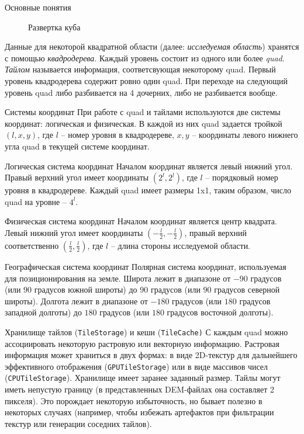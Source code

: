 \documentclass[12pt]{article}
\newcommand{\englishterm}[1]{\textenglish{\texttt{#1}}}
\begin{document}
\begin{section}{Основные понятия}
\begin{figure}[h]
\begin{minipage}{0.45\textwidth}
        \caption{Развертка куба}
        \label{fig:net}
    \end{minipage}
\end{figure}

Данные для некоторой квадратной области (далее: \textit{исследуемая область}) хранятся с помощью \textit{квадродерева}. Каждый уровень состоит из одного или более \textit{quad}. \textit{Тайлом} называется информация, соответсвующая некоторому quad.
Первый уровень квадродерева содержит ровно один quad. При переходе на следующий уровень quad либо разбивается на 4 дочерних, либо не разбивается вообще.

\begin{subsection}{Системы координат}
При работе с quad и тайлами используются две системы координат: логическая и физическая. В каждой из них quad задается тройкой $(l, x, y)$, где $l$ -- номер уровня в квадродереве, $x, y$ -- координаты левого нижнего угла quad в текущей системе координат.

\begin{paragraph}{Логическая система координат}
Началом координат является левый нижний угол. Правый верхний угол имеет координаты $(2^l, 2^l)$, где $l$ -- порядковый номер уровня в квадродереве. Каждый quad имеет размеры 1x1, таким образом, число quad на уровне -- $4^l$.
\end{paragraph}

\begin{paragraph}{Физическая система координат}
Началом координат является центр квадрата. Левый нижний угол имеет координаты $(-\frac{l}{2}, -\frac{l}{2})$, правый верхний соответственно $(\frac{l}{2}, \frac{l}{2})$, где $l$ -- длина стороны исследуемой области.
\end{paragraph}

\begin{paragraph}{Географическая система координат}
Полярная система координат, используемая для позиционирования на земле.
Широта лежит в диапазоне от $-90$ градусов (или $90$ градусов южной широты) до $90$ градусов (или $90$ градусов северной широты).
Долгота лежит в диапазоне от $-180$ градусов (или $180$ градусов западной долготы) до $180$ градусов (или $180$ градусов восточной долготы).
\end{paragraph}
\end{subsection}

\begin{subsection}{Хранилище тайлов (\englishterm{TileStorage}) и кеши (\englishterm{TileCache)}}
С каждым quad можно ассоциировать некоторую растровую или векторную информацию. Растровая информация может храниться в двух формах: в виде 2D-текстур для дальнейшего эффективного отображения (\englishterm{GPUTileStorage}) или в виде массивов чисел (\englishterm{CPUTileStorage}).
Хранилище имеет заранее заданный размер. Тайлы могут иметь непустую границу (в представленных DEM-файлах она составляет 2 пикселя). Это порождает некоторую избыточность, но бывает полезно в некоторых случаях (например, чтобы избежать артефактов при фильтрации текстур или генерации соседних тайлов).


\end{subsection}
\end{section}
\end{document}
